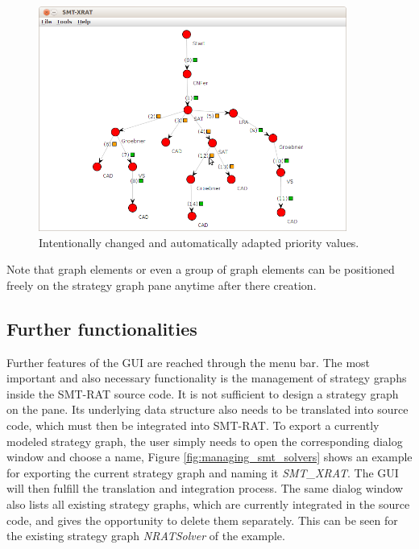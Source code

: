 \begin{figure}
  \begin{center}
    \includegraphics[width=0.9\textwidth]{graphics/smt-xrat_priority_b.png}
  \end{center}
  \caption{Intentionally changed and automatically adapted priority values.}
  \label{fig:smt-xrat_priority_b}
\end{figure}

Note that graph elements or even a group of graph elements can be positioned freely on the strategy graph pane anytime after there creation.

\subsection{Further functionalities}
\label{sec:further_functionalities}
Further features of the GUI are reached through the menu bar. The most important and also necessary functionality is the management of strategy graphs inside the SMT-RAT source code. It is not sufficient to design a strategy graph on the pane. Its underlying data structure also needs to be translated into source code, which must then be integrated into SMT-RAT. To export a currently modeled strategy graph, the user simply needs to open the corresponding dialog window and choose a name, Figure \ref{fig:managing_smt_solvers} shows an example for exporting the current strategy graph and naming it \emph{SMT\_XRAT}. The GUI will then fulfill the translation and integration process. The same dialog window also lists all existing strategy graphs, which are currently integrated in the source code, and gives the opportunity to delete them separately. This can be seen for the existing strategy graph \emph{NRATSolver} of the example.

